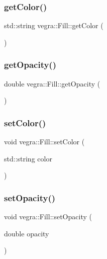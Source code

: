 \subsubsection{\texorpdfstring{get\+Color()}{getColor()}}
{\footnotesize\ttfamily std\+::string vegra\+::\+Fill\+::get\+Color (\begin{DoxyParamCaption}{ }\end{DoxyParamCaption})\hspace{0.3cm}{\ttfamily [inline]}}

\mbox{\label{structvegra_1_1Fill_a53203023282b847dec9aa3bf55507cde}} 
\subsubsection{\texorpdfstring{get\+Opacity()}{getOpacity()}}
{\footnotesize\ttfamily double vegra\+::\+Fill\+::get\+Opacity (\begin{DoxyParamCaption}{ }\end{DoxyParamCaption})\hspace{0.3cm}{\ttfamily [inline]}}

\mbox{\label{structvegra_1_1Fill_ab05e35510d4dfec3455cb537ab5bc227}} 
\subsubsection{\texorpdfstring{set\+Color()}{setColor()}}
{\footnotesize\ttfamily void vegra\+::\+Fill\+::set\+Color (\begin{DoxyParamCaption}\item[{std\+::string}]{color }\end{DoxyParamCaption})\hspace{0.3cm}{\ttfamily [inline]}}

\mbox{\label{structvegra_1_1Fill_a4968a0a2cb88537a0ea6aaf6bf095ad5}} 
\subsubsection{\texorpdfstring{set\+Opacity()}{setOpacity()}}
{\footnotesize\ttfamily void vegra\+::\+Fill\+::set\+Opacity (\begin{DoxyParamCaption}\item[{double}]{opacity }\end{DoxyParamCaption})\hspace{0.3cm}{\ttfamily [inline]}}



